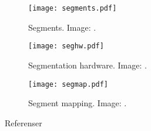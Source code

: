 \documentclass{beamer}
\begin{document}
\begin{frame}{\insertsubsectionhead}
  \begin{figure}
    \texttt{[image: segments.pdf]}
    \caption{Segments.
      Image: \cite{Silberschatz2013osc}.}
  \end{figure}
\end{frame}

\begin{frame}{\insertsubsectionhead}
  \begin{figure}
    \texttt{[image: seghw.pdf]}
    \caption{Segmentation hardware.
      Image: \cite{Silberschatz2013osc}.}
  \end{figure}
\end{frame}

\begin{frame}{\insertsubsectionhead}
  \begin{figure}
    \texttt{[image: segmap.pdf]}
    \caption{Segment mapping.
      Image: \cite{Silberschatz2013osc}.}
  \end{figure}
\end{frame}




\begin{frame}[allowframebreaks]{Referenser}
  \small
  \printbibliography
\end{frame}
\end{document}
